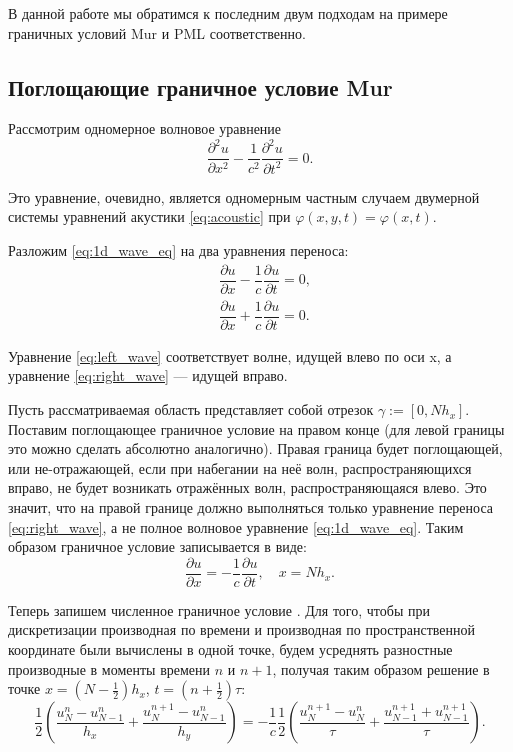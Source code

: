 \noindent В данной работе мы обратимся к последним двум подходам на примере граничных условий Mur и PML соответственно.

\subsection{Поглощающие граничное условие Mur}

Рассмотрим одномерное волновое уравнение
\begin{equation}
    \dfrac{\partial^2 u}{\partial x^2} - \dfrac{1}{c^2}\dfrac{\partial^2 u}{\partial t^2} = 0.
    \label{eq:1d_wave_eq}
\end{equation}

\noindent Это уравнение, очевидно, является одномерным частным случаем двумерной системы уравнений акустики \eqref{eq:acoustic} при $\varphi(x,y,t) = \varphi(x,t)$.

Разложим \eqref{eq:1d_wave_eq} на два уравнения переноса:
\begin{align}
    & \dfrac{\partial u}{\partial x} - \dfrac{1}{c} \dfrac{\partial u}{\partial t} = 0
    \label{eq:left_wave}
    , \\
    & \dfrac{\partial u}{\partial x} + \dfrac{1}{c} \dfrac{\partial u}{\partial t} = 0
    \label{eq:right_wave}
     .
\end{align}

\noindent Уравнение \eqref{eq:left_wave} соответствует волне, идущей влево по оси x, а уравнение \eqref{eq:right_wave} --- идущей вправо.

Пусть рассматриваемая область представляет собой отрезок $\gamma := [0, N h_x]$. Поставим поглощающее граничное условие на правом конце (для левой границы это можно сделать абсолютно аналогично). Правая граница будет  поглощающей, или не-отражающей, если при набегании на неё волн, распространяющихся вправо, не будет возникать отражённых волн, распространяющаяся влево. Это значит, что на правой границе должно выполняться только уравнение переноса \eqref{eq:right_wave}, а не полное волновое уравнение \eqref{eq:1d_wave_eq}. Таким образом граничное условие записывается в виде:
\begin{equation*}
    \dfrac{\partial u}{\partial x} = -\dfrac{1}{c} \dfrac{\partial u}{\partial t} ,\quad x = Nh_x.
\end{equation*}

Теперь запишем численное граничное условие \cite{arch_comp_sim}. Для того, чтобы при дискретизации производная по времени и производная по пространственной координате были вычислены в одной точке, будем усреднять разностные производные в моменты времени $n$ и $n+1$, получая таким образом решение в точке $x = \left(N-\frac{1}{2}\right)h_x$, $t=\left(n+\frac{1}{2}\right)\tau$:
\begin{equation*}
    \dfrac{1}{2} \left(\dfrac{u^n_N - u^n_{N-1}}{h_x} + \dfrac{u^{n+1}_N - u^n_{N-1}}{h_y} \right) = -\dfrac{1}{c} \dfrac{1}{2}\left(\dfrac{u^{n+1}_N - u^n_N}{\tau} + \dfrac{u^{n+1}_{N-1} + u^{n+1}_{N-1}}{\tau} \right) .
\end{equation*}

